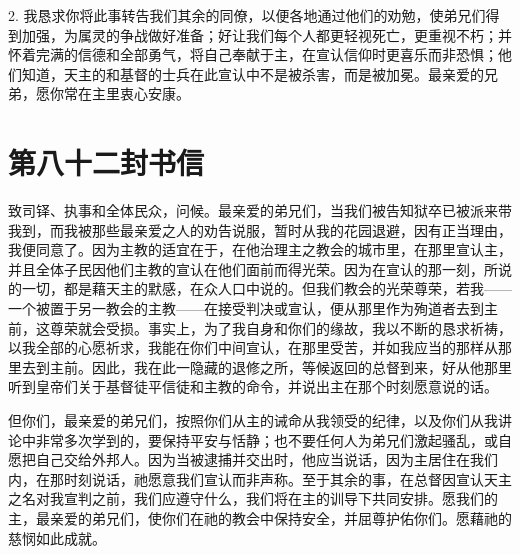 2. 我恳求你将此事转告我们其余的同僚，以便各地通过他们的劝勉，使弟兄们得到加强，为属灵的争战做好准备；好让我们每个人都更轻视死亡，更重视不朽；并怀着完满的信德和全部勇气，将自己奉献于主，在宣认信仰时更喜乐而非恐惧；他们知道，天主的和基督的士兵在此宣认中不是被杀害，而是被加冕。最亲爱的兄弟，愿你常在主里衷心安康。\par



\section{第八十二封书信}

\par

\par

致司铎、执事和全体民众，问候。最亲爱的弟兄们，当我们被告知狱卒已被派来带我到，而我被那些最亲爱之人的劝告说服，暂时从我的花园退避，因有正当理由，我便同意了。因为主教的适宜在于，在他治理主之教会的城市里，在那里宣认主，并且全体子民因他们主教的宣认在他们面前而得光荣。因为在宣认的那一刻，所说的一切，都是藉天主的默感，在众人口中说的。但我们教会的光荣尊荣，若我——一个被置于另一教会的主教——在接受判决或宣认，便从那里作为殉道者去到主前，这尊荣就会受损。事实上，为了我自身和你们的缘故，我以不断的恳求祈祷，以我全部的心愿祈求，我能在你们中间宣认，在那里受苦，并如我应当的那样从那里去到主前。因此，我在此一隐藏的退修之所，等候返回的总督到来，好从他那里听到皇帝们关于基督徒平信徒和主教的命令，并说出主在那个时刻愿意说的话。\par

但你们，最亲爱的弟兄们，按照你们从主的诫命从我领受的纪律，以及你们从我讲论中非常多次学到的，要保持平安与恬静；也不要任何人为弟兄们激起骚乱，或自愿把自己交给外邦人。因为当被逮捕并交出时，他应当说话，因为主居住在我们内，在那时刻说话，祂愿意我们宣认而非声称。至于其余的事，在总督因宣认天主之名对我宣判之前，我们应遵守什么，我们将在主的训导下共同安排。愿我们的主，最亲爱的弟兄们，使你们在祂的教会中保持安全，并屈尊护佑你们。愿藉祂的慈悯如此成就。\par

